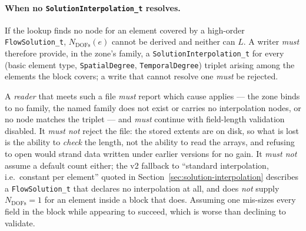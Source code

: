 \documentclass[11pt,letterpaper]{article}
\newif\ifvfourdraft
\newenvironment{v4block}{\ifvfourdraft\color{v4violet}\fi\ignorespaces}{\par}
\newcommand{\vfourmark}{\ifvfourdraft\textcolor{v4violet}{\textbf{[v4]}}\ \fi}
\begin{document}
\begin{v4block}
\paragraph{\vfourmark When no \texttt{SolutionInterpolation\_t} resolves.}
If the lookup finds no node for an element covered by a high-order
\texttt{FlowSolution\_t}, $N_\mathrm{DOFs}(e)$ cannot be derived and neither can
$L$.  A writer \emph{must} therefore provide, in the zone's family, a
\texttt{SolutionInterpolation\_t} for every (basic element type,
\texttt{SpatialDegree}, \texttt{TemporalDegree}) triplet arising among the
elements the block covers; a write that cannot resolve one \emph{must} be
rejected.

A \emph{reader} that meets such a file \emph{must} report which cause applies ---
the zone binds to no family, the named family does not exist or carries no
interpolation nodes, or no node matches the triplet --- and \emph{must} continue
with field-length validation disabled.  It \emph{must not} reject the file: the
stored extents are on disk, so what is lost is the ability to \emph{check} the
length, not the ability to read the arrays, and refusing to open would strand
data written under earlier versions for no gain.  It \emph{must not} assume a
default count either; the v2 fallback to ``standard interpolation, i.e.\
constant per element'' quoted in Section~\ref{sec:solution-interpolation}
describes a \texttt{FlowSolution\_t} that declares no interpolation at all, and
does \emph{not} supply $N_\mathrm{DOFs} = 1$ for an element inside a block that
does.  Assuming one mis-sizes every field in the block while appearing to
succeed, which is worse than declining to validate.
\end{v4block}
\end{document}
